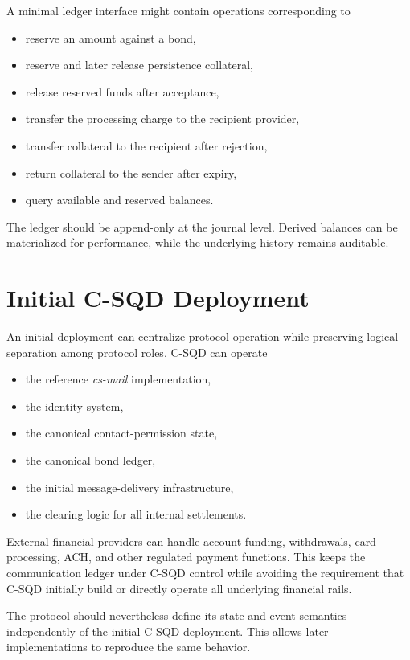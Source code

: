 \documentclass[11pt]{article}
\begin{document}
A minimal ledger interface might contain operations corresponding to

\begin{itemize}[leftmargin=2em]
    \item reserve an amount against a bond,
    \item reserve and later release persistence collateral,
    \item release reserved funds after acceptance,
    \item transfer the processing charge to the recipient provider,
    \item transfer collateral to the recipient after rejection,
    \item return collateral to the sender after expiry,
    \item query available and reserved balances.
\end{itemize}

The ledger should be append-only at the journal level. Derived balances can be materialized for performance, while the underlying history remains auditable.

\section{Initial C-SQD Deployment}

An initial deployment can centralize protocol operation while preserving logical separation among protocol roles. C-SQD can operate

\begin{itemize}[leftmargin=2em]
    \item the reference \textit{cs-mail} implementation,
    \item the identity system,
    \item the canonical contact-permission state,
    \item the canonical bond ledger,
    \item the initial message-delivery infrastructure,
    \item the clearing logic for all internal settlements.
\end{itemize}

External financial providers can handle account funding, withdrawals, card processing, ACH, and other regulated payment functions. This keeps the communication ledger under C-SQD control while avoiding the requirement that C-SQD initially build or directly operate all underlying financial rails.

The protocol should nevertheless define its state and event semantics independently of the initial C-SQD deployment. This allows later implementations to reproduce the same behavior.
\end{document}
